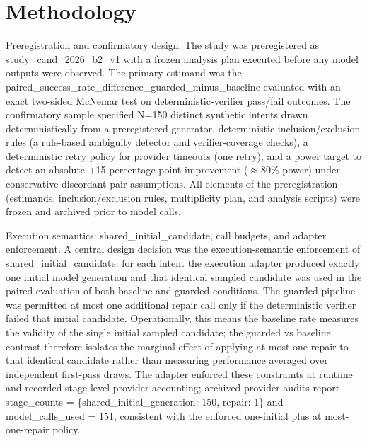 \documentclass[conference]{IEEEtran}
\begin{document}
\section{Methodology}
Preregistration and confirmatory design. The study was preregistered as study\_cand\_2026\_b2\_v1 with a frozen analysis plan executed before any model outputs were observed. The primary estimand was the paired\_success\_rate\_difference\_guarded\_minus\_baseline evaluated with an exact two-sided McNemar test on deterministic-verifier pass/fail outcomes. The confirmatory sample specified N=150 distinct synthetic intents drawn deterministically from a preregistered generator, deterministic inclusion/exclusion rules (a rule-based ambiguity detector and verifier-coverage checks), a deterministic retry policy for provider timeouts (one retry), and a power target to detect an absolute +15 percentage-point improvement (\ensuremath{\approx}80\% power) under conservative discordant-pair assumptions. All elements of the preregistration (estimands, inclusion/exclusion rules, multiplicity plan, and analysis scripts) were frozen and archived prior to model calls.

Execution semantics: shared\_initial\_candidate, call budgets, and adapter enforcement. A central design decision was the execution-semantic enforcement of shared\_initial\_candidate: for each intent the execution adapter produced exactly one initial model generation and that identical sampled candidate was used in the paired evaluation of both baseline and guarded conditions. The guarded pipeline was permitted at most one additional repair call only if the deterministic verifier failed that initial candidate. Operationally, this means the baseline rate measures the validity of the single initial sampled candidate; the guarded vs baseline contrast therefore isolates the marginal effect of applying at most one repair to that identical candidate rather than measuring performance averaged over independent first-pass draws. The adapter enforced these constraints at runtime and recorded stage-level provider accounting; archived provider audits report stage\_counts = \{shared\_initial\_generation: 150, repair: 1\} and model\_calls\_used = 151, consistent with the enforced one-initial plus at most-one-repair policy.
\end{document}
